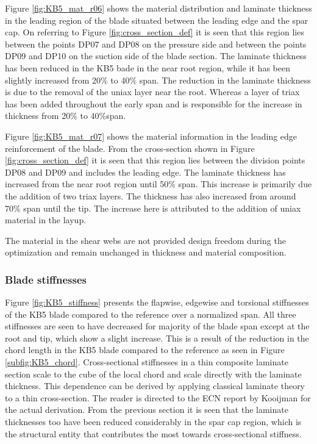 Figure \ref{fig:KB5_mat_r06} shows the material distribution and laminate thickness in the leading region of the blade situated between the leading edge and the spar cap. On referring to Figure \ref{fig:cross_section_def} it is seen that this region lies between the points DP07 and DP08 on the pressure side and between the points DP09 and DP10 on the suction side of the blade section. The laminate thickness has been reduced in the KB5 bade in the near root region, while it has been slightly increased from 20\% to 40\% span. The reduction in the laminate thickness is due to the removal of the uniax layer near the root. Whereas a layer of triax has been added throughout the early span and is responsible for the increase in thickness from 20\% to 40\%span.

Figure \ref{fig:KB5_mat_r07} shows the material information in the leading edge reinforcement of the blade. From the cross-section shown in Figure \ref{fig:cross_section_def} it is seen that this region lies between the division points DP08 and DP09 and includes the leading edge. The laminate thickness has increased from the near root region until 50\% span. This increase is primarily due the addition of two triax layers. The thickness has also increased from around 70\% span until the tip. The increase here is attributed to the addition of uniax material in the layup. 

The material in the shear webs are not provided design freedom during the optimization and remain unchanged in thickness and material composition.

\subsubsection*{Blade stiffnesses}
Figure \ref{fig:KB5_stiffness} presents the flapwise, edgewise and torsional stiffnesses of the KB5 blade compared to the reference over a normalized span. All three stiffnesses are seen to have decreased for majority of the blade span except at the root and tip, which show a slight increase. This is a result of the reduction in the chord length in the KB5 blade compared to the reference as seen in Figure \ref{subfig:KB5_chord}. Cross-sectional stiffnesses in a thin composite laminate section scale to the cube of the local chord and scale directly with the laminate thickness. This dependence can be derived by applying classical laminate theory to a thin cross-section. The reader is directed to the ECN report by Kooijman \cite{kooijman1996bending} for the actual derivation. From the previous section it is seen that the laminate thicknesses too have been reduced considerably in the spar cap region, which is the structural entity that contributes the most towards cross-sectional stiffness. 


